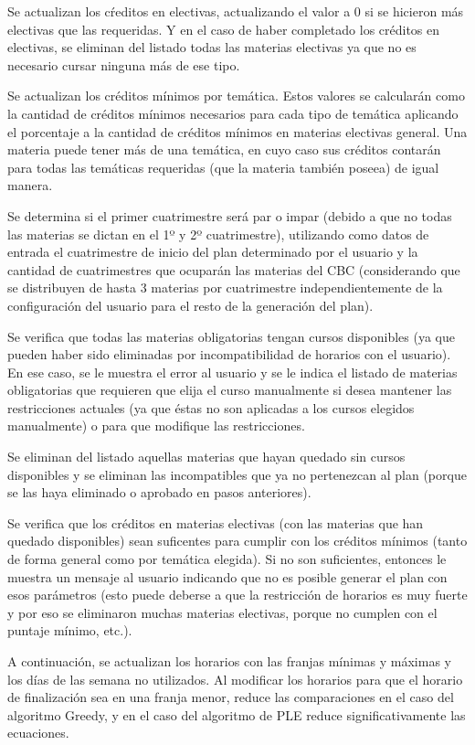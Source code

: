 \documentclass[a4paper]{article}
\begin{document}
Se actualizan los cŕeditos en electivas, actualizando el valor a 0 si se hicieron más electivas que las requeridas. Y en el caso de haber completado los créditos en electivas, se eliminan del listado todas las materias electivas ya que no es necesario cursar ninguna más de ese tipo.

Se actualizan los créditos mínimos por temática. Estos valores se calcularán como la cantidad de créditos mínimos necesarios para cada tipo de temática aplicando el porcentaje a la cantidad de créditos mínimos en materias electivas general. Una materia puede tener más de una temática, en cuyo caso sus créditos contarán para todas las temáticas requeridas (que la materia también poseea) de igual manera.

Se determina si el primer cuatrimestre será par o impar (debido a que no todas las materias se dictan en el 1º y 2º cuatrimestre), utilizando como datos de entrada el cuatrimestre de inicio del plan determinado por el usuario y la cantidad de cuatrimestres que ocuparán las materias del CBC (considerando que se distribuyen de hasta 3 materias por cuatrimestre independientemente de la configuración del usuario para el resto de la generación del plan).

Se verifica que todas las materias obligatorias tengan cursos disponibles (ya que pueden haber sido eliminadas por incompatibilidad de horarios con el usuario). En ese caso, se le muestra el error al usuario y se le indica el listado de materias obligatorias que requieren que elija el curso manualmente si desea mantener las restricciones actuales (ya que éstas no son aplicadas a los cursos elegidos manualmente) o para que modifique las restricciones.

Se eliminan del listado aquellas materias que hayan quedado sin cursos disponibles y se eliminan las incompatibles que ya no pertenezcan al plan (porque se las haya eliminado o aprobado en pasos anteriores).

Se verifica que los créditos en materias electivas (con las materias que han quedado disponibles) sean suficentes para cumplir con los créditos mínimos (tanto de forma general como por temática elegida). Si no son suficientes, entonces le muestra un mensaje al usuario indicando que no es posible generar el plan con esos parámetros (esto puede deberse a que la restricción de horarios es muy fuerte y por eso se eliminaron muchas materias electivas, porque no cumplen con el puntaje mínimo, etc.).

A continuación, se actualizan los horarios con las franjas mínimas y máximas y los días de las semana no utilizados. Al modificar los horarios para que el horario de finalización sea en una franja menor, reduce las comparaciones en el caso del algoritmo Greedy, y en el caso del algoritmo de PLE reduce significativamente las ecuaciones.
\end{document}
